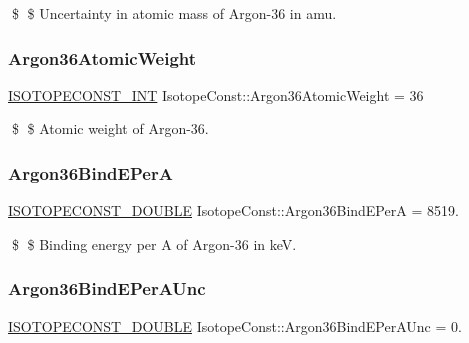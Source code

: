 \$ \$ Uncertainty in atomic mass of Argon-\/36 in amu. \mbox{\label{group___isotope_const-_argon-_ar36_gafb21b404ca4fbbb54a891366e16850b4}} 
\subsubsection{\texorpdfstring{Argon36\+Atomic\+Weight}{Argon36AtomicWeight}}
{\footnotesize\ttfamily \mbox{\hyperlink{group___isotope_const-_macros_ga5f18360b3e99483a35c32d789e62621c}{I\+S\+O\+T\+O\+P\+E\+C\+O\+N\+S\+T\+\_\+\+I\+NT}} Isotope\+Const\+::\+Argon36\+Atomic\+Weight = 36}

\$ \$ Atomic weight of Argon-\/36. \mbox{\label{group___isotope_const-_argon-_ar36_gad48f21987caec386974bd8498d182764}} 
\subsubsection{\texorpdfstring{Argon36\+Bind\+E\+PerA}{Argon36BindEPerA}}
{\footnotesize\ttfamily \mbox{\hyperlink{group___isotope_const-_macros_ga8f45a7272ce02c0b4c65c44636ed719a}{I\+S\+O\+T\+O\+P\+E\+C\+O\+N\+S\+T\+\_\+\+D\+O\+U\+B\+LE}} Isotope\+Const\+::\+Argon36\+Bind\+E\+PerA = 8519.}

\$ \$ Binding energy per A of Argon-\/36 in keV. \mbox{\label{group___isotope_const-_argon-_ar36_ga3714dc5a78a3513e8280c76d1b5eeecd}} 
\subsubsection{\texorpdfstring{Argon36\+Bind\+E\+Per\+A\+Unc}{Argon36BindEPerAUnc}}
{\footnotesize\ttfamily \mbox{\hyperlink{group___isotope_const-_macros_ga8f45a7272ce02c0b4c65c44636ed719a}{I\+S\+O\+T\+O\+P\+E\+C\+O\+N\+S\+T\+\_\+\+D\+O\+U\+B\+LE}} Isotope\+Const\+::\+Argon36\+Bind\+E\+Per\+A\+Unc = 0.}

